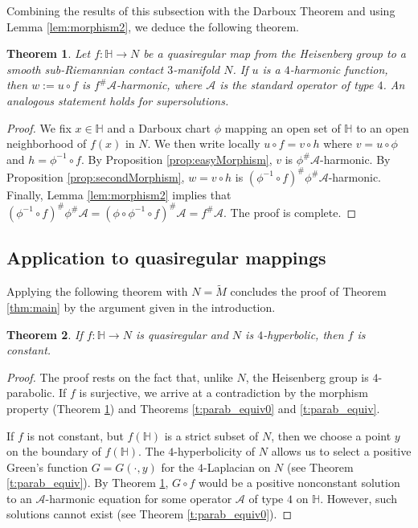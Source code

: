 \documentclass[10pt,letterpaper]{amsart}
\newtheorem{thm}{Theorem}
\theoremstyle{definition}
\numberwithin{thm}{subsection}
\numberwithin{equation}{section}
\begin{document}
Combining the results of this subsection with the Darboux Theorem and using Lemma \ref{lem:morphism2}, we deduce the following theorem.

\begin{thm}\label{t:morphism}
Let $f:{\mathbb H} \to   N$ be a quasiregular map from the Heisenberg
group to a smooth sub-Riemannian contact $3$-manifold $N$. If $u$
is a  $4$-harmonic function, then $w:= u \circ f$ is $f^\#
\mathcal{A}$-harmonic, where $\mathcal A$ is the standard operator
of type $4$. An analogous statement holds for supersolutions.
\end{thm}

\begin{proof}
We fix $x \in {\mathbb H}$ and a Darboux chart $\phi$ mapping an open
set of ${\mathbb H}$ to an open neighborhood of $f(x)$ in $N$. We then
write locally $u \circ f = v \circ h$ where $v = u \circ \phi$ and
$h = \phi^{-1} \circ f$. By Proposition \ref{prop:easyMorphism},
$v$ is $\phi^\#\mathcal A$-harmonic. By Proposition
\ref{prop:secondMorphism}, $w = v\circ h$ is $(\phi^{-1}\circ
f)^\# \phi^\# \mathcal A$-harmonic. Finally, Lemma
\ref{lem:morphism2} implies that $(\phi^{-1}\circ f)^\# \phi^\#
\mathcal A =
(\phi \circ \phi^{-1} \circ f)^\#\mathcal A= f^\#\mathcal A$. The proof is complete.
\end{proof}

\subsection{Application to quasiregular mappings}
\label{sec:victory}
Applying the following theorem with $N=\widetilde{M}$ concludes the proof of Theorem \ref{thm:main} by the argument given in the introduction.

\begin{thm}\label{t:no_qr}
If $f:{\mathbb H} \to N$ is quasiregular and $N$ is $4$-hyperbolic, then $f$ is constant.
\end{thm}

\begin{proof}
The proof rests on the fact that, unlike $N$, the Heisenberg group is $4$-parabolic.
If $f$ is surjective, we arrive at a contradiction by the morphism property (Theorem \ref{t:morphism}) and Theorems \ref{t:parab_equiv0} and \ref{t:parab_equiv}.

If $f$ is not constant, but $f({\mathbb H})$ is a strict subset of $N$,
then we choose a point $y$ on the boundary of $f({\mathbb H})$. The
$4$-hyperbolicity of $N$ allows us to select a  positive Green's
function $G=G(\cdot,y)$ for the $4$-Laplacian on $N$ (see Theorem
\ref{t:parab_equiv}). By Theorem \ref{t:morphism}, $G\circ f$
would be a positive nonconstant solution to an $\mathcal
A$-harmonic equation for some operator $\mathcal A$ of type $4$ on
${\mathbb H}$. However, such solutions cannot exist (see Theorem
\ref{t:parab_equiv0}).
\end{proof}
\end{document}
